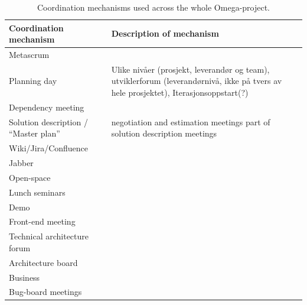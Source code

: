 \begin{table}[H]
\begin{center}
    \begin{tabular}{| p{6cm} | p{9cm} |}
    \hline
    \textbf{Coordination mechanism} & \textbf{Description of mechanism} \\ \hline
    Metascrum & \\ \hline
    Planning day & Ulike nivåer (prosjekt, leverandør og team), utviklerforum (leverandørnivå, ikke på tvers av hele prosjektet), Iterasjonsoppstart(?) \\ \hline
    Dependency meeting & \\ \hline
    Solution description / ``Master plan'' & negotiation and estimation meetings part of solution description meetings \\ \hline
    Wiki/Jira/Confluence & \\ \hline
    Jabber & \\ \hline
    Open-space & \\ \hline
    Lunch seminars & \\ \hline
    Demo & \\ \hline
    Front-end meeting & \\ \hline
    Technical architecture forum & \\ \hline
    Architecture board & \\ \hline
    Business & \\ \hline
    Bug-board meetings  & \\ \hline
    \end{tabular}
    \caption{Coordination mechanisms used across the whole Omega-project.}
    \label{cmuatwo}
\end{center}
\end{table}

